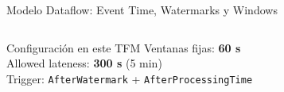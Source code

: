 \documentclass[aspectratio=169, 10pt]{beamer}
\begin{document}
\begin{frame}{Modelo Dataflow: Event Time, Watermarks y Windows}
\begin{columns}[t]
      \vspace{4pt}
      \begin{exampleblock}{\small Configuraci\'on en este TFM}
        \scriptsize
        Ventanas fijas: \textbf{60 s}\\
        Allowed lateness: \textbf{300 s} (5 min)\\
        Trigger: \texttt{AfterWatermark} + \texttt{AfterProcessingTime}
      \end{exampleblock}
  \end{columns}
\end{frame}

\end{document}
